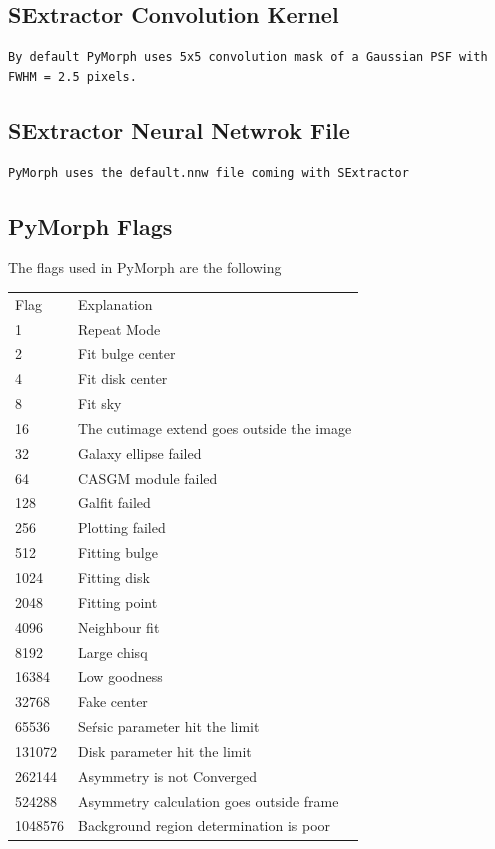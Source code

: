\documentclass[a4paper,10pt]{article}
\begin{document}
\subsection{SExtractor Convolution Kernel}
\begin{footnotesize}
\begin{verbatim}
By default PyMorph uses 5x5 convolution mask of a Gaussian PSF with FWHM = 2.5 pixels.
\end{verbatim}
\end{footnotesize}
\subsection{SExtractor Neural Netwrok File}
\begin{footnotesize}
\begin{verbatim}
PyMorph uses the default.nnw file coming with SExtractor
\end{verbatim}
\end{footnotesize}
\subsection{PyMorph Flags}
The flags used in PyMorph are the following

\begin{center}
\begin{tabular}{ll}
Flag & Explanation \\ 
1 & Repeat Mode \\ 
2 & Fit bulge center \\ 
4 & Fit disk center \\ 
8 & Fit sky \\ 
16 & The cutimage extend goes outside the image \\ 
32 & Galaxy ellipse failed \\ 
64 & CASGM module failed \\ 
128 & Galfit failed \\ 
256 & Plotting failed \\ 
512 & Fitting bulge \\ 
1024 & Fitting disk \\ 
2048 & Fitting point \\ 
4096 & Neighbour fit \\ 
8192 & Large chisq  \\ 
16384 & Low goodness \\ 
32768 & Fake center \\ 
65536 & Se\'rsic parameter hit the limit \\ 
131072 & Disk parameter hit the limit \\
262144 & Asymmetry is not Converged \\
524288 & Asymmetry calculation goes outside frame \\
1048576 & Background region determination is poor \\
\end{tabular}
\end{center}
\end{document}

